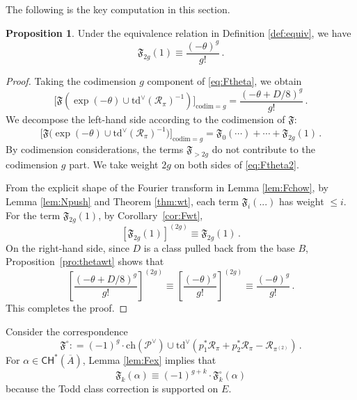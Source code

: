 \documentclass[11pt]{article}
\def\CH{\mathsf{CH}}
\def\P{\mathcal{P}}
\def\codim{\mathrm{codim}}
\def\ch{\mathrm{ch}}
\def\Td{\mathrm{td}}
\def\fm{\mathfrak{F}}
\def\cR{\mathcal{R}}
\newcommand{\barA}{\overline{A}}
\theoremstyle{definition}
\newtheorem{proposition}[definition]{Proposition}
\begin{document}
The following is the key computation in this section.

\begin{proposition}\label{pro:Fleading}
    Under the equivalence relation in Definition \ref{def:equiv}, we have
    \[
    \fm_{2g}(1) \equiv \frac{(-\theta)^g}{g!}\,.
    \]
\end{proposition}

\begin{proof}
    Taking the codimension $g$ component of \eqref{eq:Ftheta}, we obtain
	\begin{equation}\label{eq:Ftheta2}
    \Big[\fm(\exp(-\theta) \cup \Td^\vee(\cR_\pi)^{-1})\Big]_{\codim = g} = \frac{(-\theta +D/8)^g}{g!}\,.
    \end{equation}
    We decompose the left-hand side according to the codimension of $\fm$:
    \[
    \Big[\fm\big(\exp(-\theta)\cup \Td^\vee(\cR_\pi)^{-1}\big)\Big]_{\codim = g} = \fm_0(\cdots) + \cdots + \fm_{2g}(1)\,.
    \]
    By codimension considerations, the terms $\fm_{>2g}$ do not contribute to the codimension $g$ part. We take weight $2g$ on both sides of \eqref{eq:Ftheta2}.

    From the explicit shape of the Fourier transform in Lemma \ref{lem:Fchow}, by Lemma \ref{lem:Npush} and Theorem \ref{thm:wt}, each term $\fm_i(...)$ has weight $\leq i$. For the term $\fm_{2g}(1)$, by Corollary~\ref{cor:Fwt},
    \[
    [\fm_{2g}(1)]^{(2g)} \equiv \fm_{2g}(1)\,.
    \]
    On the right-hand side, since $D$ is a class pulled back from the base $B$, Proposition~\ref{pro:thetawt} shows that
    \[
    \left[\frac{(-\theta + D/8)^g}{g!}\right]^{(2g)} \equiv \left[\frac{(-\theta)^g}{g!}\right]^{(2g)} \equiv \frac{(-\theta)^g}{g!}\,.
    \]
    This completes the proof.
\end{proof}


Consider the correspondence
\[
\fm^\circ : = (-1)^g \cdot \ch(\P^\vee) \cup \Td^\vee(p_1^*\cR_\pi + p_2^*\cR_\pi-\cR_{\pi^{(2)}})\,.
\]
For $\alpha\in\CH^*(\barA)$, Lemma \ref{lem:Fex} implies that
\[
\fm_k (\alpha) \equiv (-1)^{g+k} \cdot \fm_k^\circ(\alpha)
\]
because the Todd class correction is supported on $E$.
\end{document}
